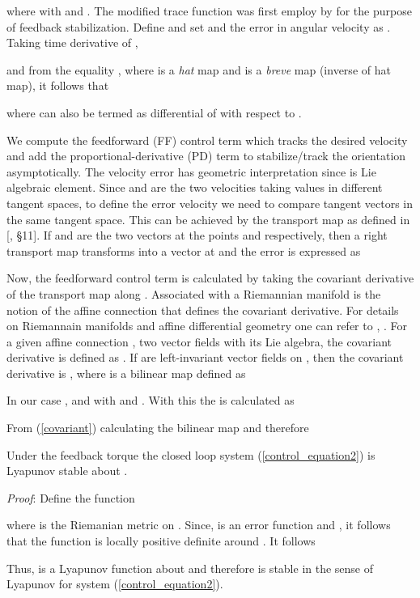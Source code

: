\documentclass{ifacconf}
\begin{document}
where  with  and . The modified trace function was first employ by \citep{chillingworth_marsden_wan} for the purpose of feedback stabilization. Define  and set  and the error in angular velocity as . Taking time derivative of ,

and from the equality , where  is a \textit{hat} map and  is a \textit{breve} map (inverse of hat map), it follows that
 
where  can also be termed as differential of  with respect to .

We compute the feedforward (FF) control term which tracks the desired velocity and add the proportional-derivative (PD) term to stabilize/track the orientation asymptotically. The velocity error has geometric interpretation since  is Lie algebraic element. Since  and  are the two velocities taking values in different tangent spaces, to define the error velocity we need to compare tangent vectors in the same tangent space. This can be achieved by the transport map  as defined in [\citep{book_bullo}, \S 11]. If  and  are the two vectors at the points  and  respectively, then a right transport map  transforms  into a vector at  and the error is expressed as

Now, the feedforward control term is calculated by taking the covariant derivative of the transport map along . Associated with a Riemannian manifold is the notion of the affine connection  that defines the covariant derivative. For details on Riemannain manifolds and affine differential geometry one can refer to \citep{do_carmo}, \citep{book_bullo}. For a given affine connection , two vector fields  with  its Lie algebra, the covariant derivative is defined as . If  are left-invariant vector fields on , then the covariant derivative is , 
where  is a bilinear map defined as 

In our case ,  and  with  and . With this the  is calculated as 

From (\ref{covariant}) calculating the bilinear map and therefore 

\begin{thm}
Under the feedback torque  the closed loop system (\ref{control_equation2}) is Lyapunov stable about .
\end{thm}
\textit{Proof}: Define the function 

where  is the Riemanian metric on . Since,  is an error function and , it follows that the function  is locally positive definite around . It follows

Thus,  is a Lyapunov function about  and therefore  is stable in the sense of Lyapunov for system (\ref{control_equation2}). \\
\end{document}
